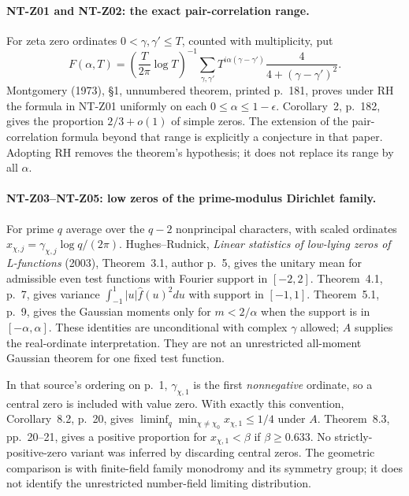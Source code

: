 \paragraph{NT-Z01 and NT-Z02: the exact pair-correlation range.}
For zeta zero ordinates $0<\gamma,\gamma'\le T$, counted with
multiplicity, put
\[
 F(\alpha,T)=\left(\frac{T}{2\pi}\log T\right)^{-1}
 \sum_{\gamma,\gamma'}T^{i\alpha(\gamma-\gamma')}
                    \frac4{4+(\gamma-\gamma')^2}.
\]
Montgomery (1973), \S1, unnumbered theorem, printed p.~181, proves under
RH the formula in NT-Z01 uniformly on each $0\le\alpha\le1-\epsilon$.
Corollary~2, p.~182, gives the proportion $2/3+o(1)$ of simple zeros.
The extension of the pair-correlation formula beyond that range is
explicitly a conjecture in that paper.  Adopting RH removes the theorem's
hypothesis; it does not replace its range by all $\alpha$.

\paragraph{NT-Z03--NT-Z05: low zeros of the prime-modulus Dirichlet family.}
For prime $q$ average over the $q-2$ nonprincipal characters, with scaled
ordinates $x_{\chi,j}=\gamma_{\chi,j}\log q/(2\pi)$.
Hughes--Rudnick, \emph{Linear statistics of low-lying zeros of
L-functions} (2003), Theorem~3.1, author p.~5, gives the unitary mean for
admissible even test functions with Fourier support in $[-2,2]$.
Theorem~4.1, p.~7, gives variance
$\int_{-1}^1|u|\widehat f(u)^2du$ with support in $[-1,1]$.
Theorem~5.1, p.~9, gives the Gaussian moments only for
$m<2/\alpha$ when the support is in $[-\alpha,\alpha]$.
These identities are unconditional with complex $\gamma$ allowed;
$A$ supplies the real-ordinate interpretation.  They are not an
unrestricted all-moment Gaussian theorem for one fixed test function.

In that source's ordering on p.~1, $\gamma_{\chi,1}$ is the first
\emph{nonnegative} ordinate, so a central zero is included with value zero.
With exactly this convention, Corollary~8.2, p.~20, gives
$\liminf_q\min_{\chi\ne\chi_0}x_{\chi,1}\le1/4$ under $A$.
Theorem~8.3, pp.~20--21, gives a positive proportion for
$x_{\chi,1}<\beta$ if $\beta\ge0.633$.
No strictly-positive-zero variant was inferred by discarding central
zeros.  The geometric comparison is with finite-field family monodromy
and its symmetry group; it does not identify the unrestricted
number-field limiting distribution.

